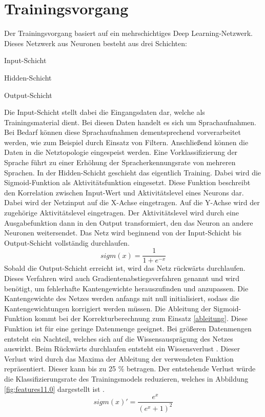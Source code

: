\section{Trainingsvorgang}

Der Trainingsvorgang basiert auf ein mehrschichtiges Deep Learning-Netzwerk. Dieses Netzwerk aus Neuronen besteht aus drei Schichten:
\begin{description}
	\item Input-Schicht
	\item Hidden-Schicht 
	\item Output-Schicht
\end{description}
Die Input-Schicht stellt dabei die Eingangsdaten dar, welche als Trainingsmaterial dient. Bei diesen Daten handelt es sich um Sprachaufnahmen. Bei Bedarf können diese Sprachaufnahmen dementsprechend vorverarbeitet werden, wie zum Beispiel durch Einsatz von Filtern. Anschließend können die Daten in die Netztopologie eingespeist werden. Eine Vorklassifizierung der Sprache führt zu einer Erhöhung der Spracherkennungsrate von mehreren Sprachen. In der Hidden-Schicht geschieht das eigentlich Training. Dabei wird die Sigmoid-Funktion als Aktivitätsfunktion eingesetzt. Diese Funktion beschreibt den Korrelation zwischen Input-Wert und  Aktivitätslevel eines Neurons dar. Dabei wird der Netzinput auf die X-Achse eingetragen. Auf die Y-Achse wird der zugehörige Aktivitätslevel eingetragen. Der Aktivitätslevel wird durch eine  Ausgabefunktion dann in den Output transformiert, den das Neuron an andere Neuronen weitersendet\cite{Neuronal31:online}. Das Netz wird beginnend von der Input-Schicht bis Output-Schicht vollständig durchlaufen. 
\begin{equation}
sigm(x)=\frac{ 1 }{1+e^{-x}  }
\label{normal}
\end{equation}
Sobald die Output-Schicht erreicht ist, wird das Netz rückwärts durchlaufen. Dieses Verfahren wird auch Gradientenabstiegsverfahren genannt und wird benötigt, um fehlerhafte Kantengewichte herauszufinden und anzupassen. Die Kantengewichte des Netzes werden anfangs mit null initialisiert, sodass die Kantengewichtungen korrigiert werden müssen. Die Ableitung der Sigmoid-Funktion kommt bei der Korrekturberechnung zum Einsatz \ref{ableitung}. Diese Funktion ist für eine geringe Datenmenge geeignet. Bei größeren Datenmengen entsteht ein Nachteil, welches sich auf die Wissensausprägung des Netzes auswirkt. Beim Rückwärts durchlaufen entsteht ein Wissensverlust \cite{bishop.2006}. Dieser Verlust wird durch das Maxima der Ableitung der verwendeten Funktion repräsentiert. Dieser kann bis zu 25 \% betragen. Der entstehende Verlust würde die Klassifizierungsrate des Trainingsmodels reduzieren, welches in Abbildung \ref{fig:features11.0} dargestellt ist \cite{Kulbear.2017}.
\begin{equation}
sigm(x)'= \frac{ e^{x} }{(e^{x} +1)^2  }
\label{ableitung}
\end{equation}

